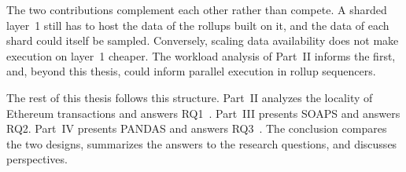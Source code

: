The two contributions complement each other rather than compete.
A sharded layer~1 still has to host the data of the rollups built on it, and the data of each shard could itself be sampled.
Conversely, scaling data availability does not make execution on layer~1 cheaper.
The workload analysis of Part~II informs the first, and, beyond this thesis, could inform parallel execution in rollup sequencers.

The rest of this thesis follows this structure.
Part~II analyzes the locality of Ethereum transactions and answers RQ1~\cite{pigaglio2023exploring}.
Part~III presents SOAPS and answers RQ2. 
Part~IV presents PANDAS and answers RQ3~\cite{pigaglio2025pandas}.
The conclusion compares the two designs, summarizes the answers to the research questions, and discusses perspectives.
